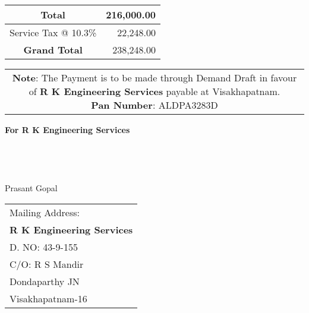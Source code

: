 \documentclass[11pt]{article}
\begin{document}
{\begin{center}
\begin{tabular}{|c|c|c|c|c|c|}
 & & &  & &  \\
 \hline

                                    
\end{tabular}
\end{center}
}

\vspace*{0.2cm}

\hspace*{13.45cm}
\begin{tabular}{|c|r|}
\hline
Total & 216,000.00 \\
\hline
Service Tax @ 10.3\% & 22,248.00 \\
\hline
{\bf Grand Total} & 238,248.00 \\
\hline
\end{tabular}

\vspace*{-1 cm}
\begin{tabular}{c}
\parbox{4in}{ {\bf Note}: The Payment is to be made through Demand Draft in favour of {\bf R K Engineering Services} payable at Visakhapatnam. \\
{\noindent \bf Pan Number}:  ALDPA3283D }\\
\end{tabular}
\vspace*{65pt}


{\bf For  R K Engineering Services } \\ \\ \\ \\ \\
 \hspace*{0.6cm}Prasant Gopal
\vspace*{-71pt}
\begin{flushright}
\begin{tabular}{l}
Mailing Address:\\
{\bf R K Engineering Services}\\
D. NO: 43-9-155\\
C/O: R  S Mandir\\
Dondaparthy JN\\ 
Visakhapatnam-16\\
\end{tabular}
\end{flushright}
\end{document}
